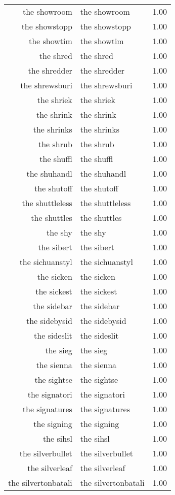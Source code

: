 \begin{table}[ht]
\begin{tabular}{rlr}
  the showroom & the showroom & 1.00 \\ 
  the showstopp & the showstopp & 1.00 \\ 
  the showtim & the showtim & 1.00 \\ 
  the shred & the shred & 1.00 \\ 
  the shredder & the shredder & 1.00 \\ 
  the shrewsburi & the shrewsburi & 1.00 \\ 
  the shriek & the shriek & 1.00 \\ 
  the shrink & the shrink & 1.00 \\ 
  the shrinks & the shrinks & 1.00 \\ 
  the shrub & the shrub & 1.00 \\ 
  the shuffl & the shuffl & 1.00 \\ 
  the shuhandl & the shuhandl & 1.00 \\ 
  the shutoff & the shutoff & 1.00 \\ 
  the shuttleless & the shuttleless & 1.00 \\ 
  the shuttles & the shuttles & 1.00 \\ 
  the shy & the shy & 1.00 \\ 
  the sibert & the sibert & 1.00 \\ 
  the sichuanstyl & the sichuanstyl & 1.00 \\ 
  the sicken & the sicken & 1.00 \\ 
  the sickest & the sickest & 1.00 \\ 
  the sidebar & the sidebar & 1.00 \\ 
  the sidebysid & the sidebysid & 1.00 \\ 
  the sideslit & the sideslit & 1.00 \\ 
  the sieg & the sieg & 1.00 \\ 
  the sienna & the sienna & 1.00 \\ 
  the sightse & the sightse & 1.00 \\ 
  the signatori & the signatori & 1.00 \\ 
  the signatures & the signatures & 1.00 \\ 
  the signing & the signing & 1.00 \\ 
  the sihsl & the sihsl & 1.00 \\ 
  the silverbullet & the silverbullet & 1.00 \\ 
  the silverleaf & the silverleaf & 1.00 \\ 
  the silvertonbatali & the silvertonbatali & 1.00 \\ 

\end{tabular}
\end{table}

